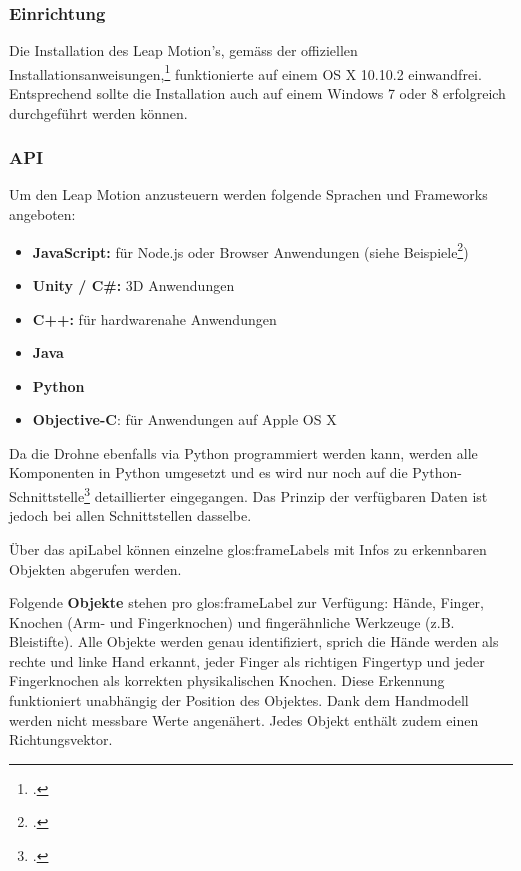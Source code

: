 \subsubsection{Einrichtung}
Die Installation des Leap Motion's, gemäss der offiziellen Installationsanweisungen,\footcite{Getting_Started_Leap_Motion_Developers_2015-03-28} funktionierte auf einem OS X 10.10.2 einwandfrei.
Entsprechend sollte  die Installation auch auf einem Windows 7 oder 8 erfolgreich durchgeführt werden können.

\subsubsection{API}
\label{subsec:leapmotion:api}
Um den Leap Motion anzusteuern werden folgende Sprachen und Frameworks angeboten:
\begin{itemize}
	\item \textbf{JavaScript:} für Node.js oder Browser Anwendungen (siehe Beispiele\footcite{Getting_Started_Leap_Motion_Developers_2015-03-28})
	\item \textbf{Unity / C\#:} 3D Anwendungen
	\item \textbf{C++:} für hardwarenahe Anwendungen
	\item \textbf{Java}
	\item \textbf{Python}
	\item \textbf{Objective-C}: für Anwendungen auf Apple OS X
\end{itemize}

Da die Drohne ebenfalls via Python programmiert werden kann, werden alle Komponenten in Python umgesetzt und es wird nur noch auf die Python-Schnittstelle\footcite{Python_SDK_Documentation__Leap_Motion_Python_SDK_v2.2_documentation_2015-03-28} detaillierter eingegangen. Das Prinzip der verfügbaren Daten ist jedoch bei allen Schnittstellen dasselbe.

Über das \gls{apiLabel} können einzelne \glspl{glos:frameLabel} mit Infos zu erkennbaren Objekten abgerufen werden.

Folgende \textbf{Objekte} stehen pro \gls{glos:frameLabel} zur Verfügung: Hände, Finger, Knochen (Arm- und Fingerknochen) und fingerähnliche Werkzeuge (z.B. Bleistifte).
Alle Objekte werden genau identifiziert, sprich die Hände werden als rechte und linke Hand erkannt, jeder Finger als richtigen Fingertyp und jeder Fingerknochen als korrekten physikalischen Knochen. Diese Erkennung funktioniert unabhängig der Position des Objektes. Dank dem Handmodell werden nicht messbare Werte angenähert.
Jedes Objekt enthält zudem einen Richtungsvektor.

